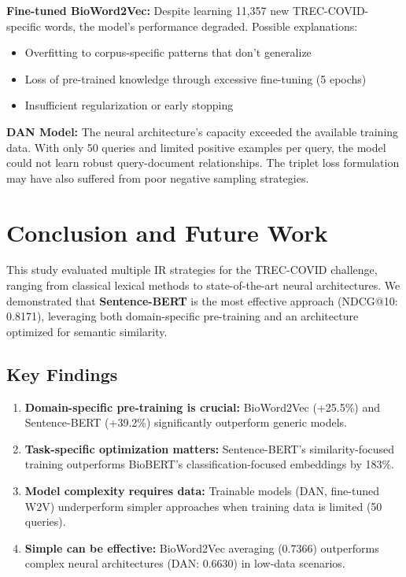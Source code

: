 \documentclass[sigconf,nonacm]{acmart}
\begin{document}
\textbf{Fine-tuned BioWord2Vec:} Despite learning 11,357 new TREC-COVID-specific words, the model's performance degraded. Possible explanations:
\begin{itemize}
    \item Overfitting to corpus-specific patterns that don't generalize
    \item Loss of pre-trained knowledge through excessive fine-tuning (5 epochs)
    \item Insufficient regularization or early stopping
\end{itemize}

\textbf{DAN Model:} The neural architecture's capacity exceeded the available training data. With only 50 queries and limited positive examples per query, the model could not learn robust query-document relationships. The triplet loss formulation may have also suffered from poor negative sampling strategies.



\section{Conclusion and Future Work}
This study evaluated multiple IR strategies for the TREC-COVID challenge, ranging from classical lexical methods to state-of-the-art neural architectures. We demonstrated that \textbf{Sentence-BERT} is the most effective approach (NDCG@10: 0.8171), leveraging both domain-specific pre-training and an architecture optimized for semantic similarity.

\subsection{Key Findings}
\begin{enumerate}
    \item \textbf{Domain-specific pre-training is crucial:} BioWord2Vec (+25.5\%) and Sentence-BERT (+39.2\%) significantly outperform generic models.
    \item \textbf{Task-specific optimization matters:} Sentence-BERT's similarity-focused training outperforms BioBERT's classification-focused embeddings by 183\%.
    \item \textbf{Model complexity requires data:} Trainable models (DAN, fine-tuned W2V) underperform simpler approaches when training data is limited (50 queries).
    \item \textbf{Simple can be effective:} BioWord2Vec averaging (0.7366) outperforms complex neural architectures (DAN: 0.6630) in low-data scenarios.
\end{enumerate}
\end{document}
